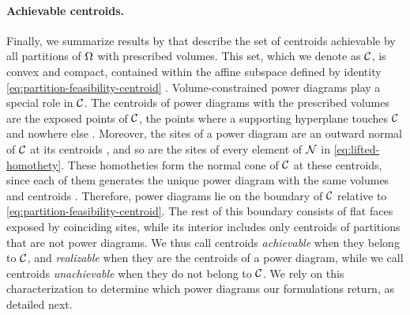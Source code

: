 \documentclass[main.tex]{subfiles}
\begin{document}
\paragraph{Achievable centroids.}
Finally, we summarize results by \citet{Bourne2025Inverting, Bourne2026ConvexOrder} that describe the set of centroids achievable by all partitions of $\Omega$ with prescribed volumes.
This set, which we denote as $\mathcal{C}$, is convex and compact, contained within the affine subspace defined by identity \eqref{eq:partition-feasibility-centroid} \cite[\S3.1]{Bourne2026ConvexOrder}.
% 
Volume-constrained power diagrams play a special role in $\mathcal{C}$.
The centroids of power diagrams with the prescribed volumes are the exposed points of $\mathcal{C}$, \ie the points where a supporting hyperplane touches $\mathcal{C}$ and nowhere else \cite[Thm.~3.6]{Bourne2026ConvexOrder}.
Moreover, the sites of a power diagram are an outward normal of $\mathcal{C}$ at its centroids \cite[Prop.~3.5]{Bourne2026ConvexOrder}, and so are the sites of every element of $\mathcal{N}$ in \eqref{eq:lifted-homothety}.
These homotheties form the {normal cone} of $\mathcal{C}$ at these centroids, 
since each of them generates the unique power diagram with the same volumes and centroids \cite[Thm.~4.5]{Bourne2025Inverting}.
Therefore, power diagrams lie on the boundary of $\mathcal{C}$ relative to \eqref{eq:partition-feasibility-centroid}.
The rest of this boundary consists of flat faces exposed by coinciding sites, while its interior includes only centroids of partitions that are not power diagrams.
We thus call centroids \emph{achievable} when they belong to $\mathcal{C}$, and \emph{realizable} when they are the centroids of a power diagram, while we call centroids \emph{unachievable} when they do not belong to $\mathcal{C}$.
%
We rely on this characterization to determine which power diagrams our formulations return, as detailed next.
% 
\end{document}
